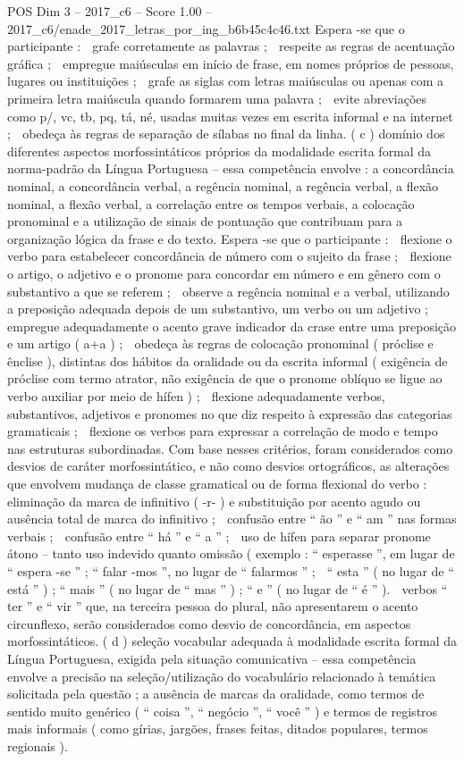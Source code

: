 \begin{textsample}{POS Dim 3 – 2017\_c6 – Score 1.00 – 2017\_c6/enade\_2017\_letras\_por\_ing\_b6b45c4c46.txt}
Espera -se que o participante :  grafe corretamente as palavras ;  respeite as regras de acentuação gráfica ;  empregue maiúsculas em início de frase, em nomes próprios de pessoas, lugares ou instituições ;  grafe as siglas com letras maiúsculas ou apenas com a primeira letra maiúscula quando formarem uma palavra ;  evite abreviações como p/, vc, tb, pq, tá, né, usadas muitas vezes em escrita informal e na internet ;  obedeça às regras de separação de sílabas no final da linha. ( c ) domínio dos diferentes aspectos morfossintáticos próprios da modalidade escrita formal da norma-padrão da Língua Portuguesa – essa competência envolve : a concordância nominal, a concordância verbal, a regência nominal, a regência verbal, a flexão nominal, a flexão verbal, a correlação entre os tempos verbais, a colocação pronominal e a utilização de sinais de pontuação que contribuam para a organização lógica da frase e do texto.
Espera -se que o participante :  flexione o verbo para estabelecer concordância de número com o sujeito da frase ;  flexione o artigo, o adjetivo e o pronome para concordar em número e em gênero com o substantivo a que se referem ;  observe a regência nominal e a verbal, utilizando a preposição adequada depois de um substantivo, um verbo ou um adjetivo ;  empregue adequadamente o acento grave indicador da crase entre uma preposição e um artigo ( a+a ) ;  obedeça às regras de colocação pronominal ( próclise e ênclise ), distintas dos hábitos da oralidade ou da escrita informal ( exigência de próclise com termo atrator, não exigência de que o pronome oblíquo se ligue ao verbo auxiliar por meio de hífen ) ;  flexione adequadamente verbos, substantivos, adjetivos e pronomes no que diz respeito à expressão das categorias gramaticais ;  flexione os verbos para expressar a correlação de modo e tempo nas estruturas subordinadas.
Com base nesses critérios, foram considerados como desvios de caráter morfossintático, e não como desvios ortográficos, as alterações que envolvem mudança de classe gramatical ou de forma flexional do verbo :  eliminação da marca de infinitivo ( -r- ) e substituição por acento agudo ou ausência total de marca do infinitivo ;  confusão entre “ ão ” e “ am ” nas formas verbais ;  confusão entre “ há ” e “ a ” ;  uso de hífen para separar pronome átono – tanto uso indevido quanto omissão ( exemplo : “ esperasse ”, em lugar de “ espera -se ” ; “ falar -mos ”, no lugar de “ falarmos ” ;  “ esta ” ( no lugar de “ está ” ) ; “ mais ” ( no lugar de “ mas ” ) ; “ e ” ( no lugar de “ é ” ).  verbos “ ter ” e “ vir ” que, na terceira pessoa do plural, não apresentarem o acento circunflexo, serão considerados como desvio de concordância, em aspectos morfossintáticos. ( d ) seleção vocabular adequada à modalidade escrita formal da Língua Portuguesa, exigida pela situação comunicativa – essa competência envolve a precisão na seleção/utilização do vocabulário relacionado à temática solicitada pela questão ; a ausência de marcas da oralidade, como termos de sentido muito genérico ( “ coisa ”, “ negócio ”, “ você ” ) e termos de registros mais informais ( como gírias, jargões, frases feitas, ditados populares, termos regionais ).

\end{textsample}
